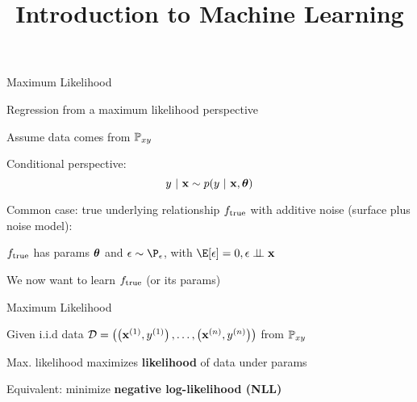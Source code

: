 \documentclass[11pt,compress,t,notes=noshow, xcolor=table]{beamer}
\title{Introduction to Machine Learning}
\begin{document}
    

\begin{framei}[sep=M]{Maximum Likelihood}

\item Regression from a maximum likelihood perspective
\item Assume data comes from $\mathbb{P}_{xy}$ 
\item Conditional perspective: 
$$
y~|~ \mathbf{x} \sim p(y~|~\mathbf{x}, \bm{\theta})
$$
\item Common case: true underlying relationship $f_{\text{true}}$ with additive noise (surface plus noise model): 

{
}

\item $f_{\text{true}}$ has params $\bm{\theta}$ and $\eps \sim\P_\eps$, with $\E[\eps] = 0, \epsilon \perp \!\!\! \perp \xv$
\item We now want to learn $f_{\text{true}}$ (or its params)

\end{framei}


\begin{framei}[sep=M]{Maximum Likelihood}

\item Given i.i.d data $\mathcal{D} = \left( \left(\mathbf{x}^{(1)}, y^{(1)}\right), \ldots, \left(\mathbf{x}^{(n)}, y^{(n)}\right)\right)$ from $\mathbb{P}_{xy}$ 
\item Max. likelihood maximizes \textbf{likelihood} of data under params

{
}

\item Equivalent: minimize \textbf{negative log-likelihood (NLL)}

\splitVCC{
$$ -\loglt = -\sumin \lpdfyigxit $$
}
{
}

\end{framei}
\end{document}
